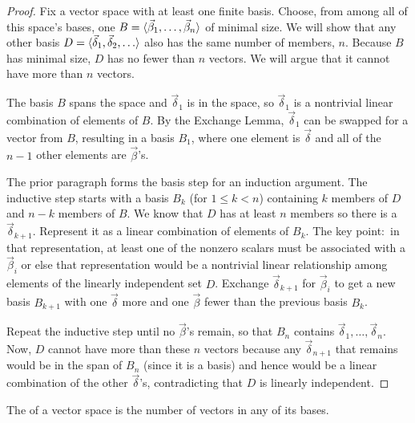 \begin{proof}
Fix a vector space with at least one finite basis.
Choose, from among all of this space's bases,
one \( B=\langle\vec{\beta}_1,\dots,\vec{\beta}_n\rangle \) of minimal size.
We will show that any other basis
\( D=\smash{\langle\vec{\delta}_1,\vec{\delta}_2,\ldots\rangle} \)
also has the same number of members, $n$.
Because \( B \) has minimal size, \( D \) has no fewer than \( n \) vectors.
We will argue that it cannot have more than \( n \) vectors.

The basis \( B \) spans the space and \( \vec{\delta}_1 \) is in the space,
so \( \vec{\delta}_1 \) is a nontrivial linear combination of elements of
\( B \).
By the Exchange Lemma, \( \vec{\delta}_1 \) can be swapped for a
vector from \( B \), resulting in a basis \( B_1 \), where one element is
\( \vec{\delta} \) and all of the \( n-1 \) other elements 
are \( \vec{\beta} \)'s.

The prior paragraph forms the basis step for an induction argument.
The inductive step starts with a basis \( B_k \) (for \( 1\leq k<n \))
containing \( k \) members of \( D \) and \( n-k \) members of \( B \).
We know that \( D \) has at least \( n \) members so there is a
\( \vec{\delta}_{k+1} \).
Represent it as a linear combination of elements of \( B_k \).
The key point:~in that representation, at least one of the nonzero scalars
must be associated with a \( \vec{\beta}_i \) or else that
representation would be a
nontrivial linear relationship among elements of the linearly independent
set \( D \).
Exchange \( \vec{\delta}_{k+1} \) for \( \vec{\beta}_i \) to get a new basis
\( B_{k+1} \) with one \( \vec{\delta} \) more and one \( \vec{\beta} \)
fewer than the previous basis \( B_k \).

Repeat the inductive step until no \( \vec{\beta} \)'s remain, so
that \( B_n \) contains  
$\vec{\delta}_1,\dots,\vec{\delta}_n$.
Now, \( D \) cannot have more than these \( n \) vectors because
any \( \vec{\delta}_{n+1} \) that remains would be in the span of
\( B_n \) (since it is a basis) 
and hence would be a linear combination of the other $\vec{\delta}$'s, 
contradicting that $D$ is linearly independent.
\end{proof}

\begin{definition}
The 
of a vector space is the number of vectors in any of its bases.
\end{definition}

